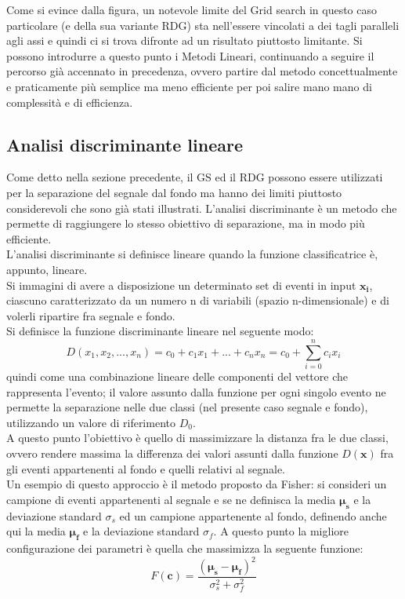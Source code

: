 Come si evince dalla figura, un notevole limite del Grid search in questo caso particolare (e della sua variante RDG) sta nell'essere vincolati a dei tagli paralleli agli assi e quindi ci si trova difronte ad un risultato piuttosto limitante. Si possono introdurre a questo punto i Metodi Lineari, continuando a seguire il percorso già accennato in precedenza, ovvero partire dal metodo concettualmente e praticamente più semplice ma meno efficiente per poi salire mano mano di complessità e di efficienza.\\

\newpage

\subsection{Analisi discriminante lineare}
\label{metodi lineari e discriminante di Fisher}

Come detto nella sezione precedente, il GS ed il RDG possono essere utilizzati per la separazione del segnale dal fondo ma hanno dei limiti piuttosto considerevoli che sono già stati illustrati. L'analisi discriminante è un metodo che permette di raggiungere lo stesso obiettivo di separazione, ma in modo più efficiente. \\
L'analisi discriminante si definisce lineare quando la funzione classificatrice è, appunto, lineare. \\
Si immagini di avere a disposizione un determinato set di eventi in input $\textbf{x}_\textbf{i}$, ciascuno caratterizzato da un numero n di variabili (spazio n-dimensionale) e di volerli ripartire fra segnale e fondo.\\
Si definisce la funzione discriminante lineare nel seguente modo:
\begin{equation}
D(x_1 , x_2 , ... , x_n) = c_0 + c_1x_1 + ... +c_nx_n = c_0 + \sum_{i=0}^{n} c_ix_i 
\end{equation}
quindi come una combinazione lineare delle componenti del vettore che rappresenta l'evento; il valore assunto dalla funzione per ogni singolo evento ne permette la separazione nelle due classi (nel presente caso segnale e fondo), utilizzando un valore di riferimento $D_0$. \\
A questo punto l'obiettivo è quello di massimizzare la distanza fra le due classi, ovvero rendere massima la differenza dei valori assunti dalla funzione $D(\textbf{x})$ fra gli eventi appartenenti al fondo e quelli relativi al segnale. \\
Un esempio di questo approccio è il metodo proposto da Fisher: si consideri un campione di eventi appartenenti al segnale e se ne definisca la media $\bm\mu_\textbf{s}$ e la deviazione standard $\sigma_s$ ed un campione appartenente al fondo, definendo anche qui la media $\bm\mu_\textbf{f}$ e la deviazione standard $\sigma_f$. A questo punto la migliore configurazione dei parametri è quella che massimizza la seguente funzione: 
\begin{equation}
F(\textbf{c}) = \frac{(\bm\mu_\textbf{s} - \bm\mu_\textbf{f})^2}{\sigma_s^2 + \sigma_f^2}
\end{equation}

